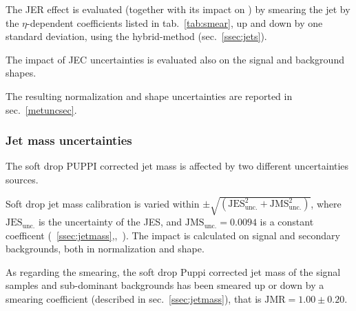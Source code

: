 \noindent The JER effect is evaluated (together with its impact on \MET) by smearing the jet \pt by the $\eta$-dependent coefficients listed in tab.~\ref{tab:smear}, up and down by one standard deviation, using the hybrid-method (sec.~\ref{ssec:jets}).%

\noindent The impact of JEC uncertainties is evaluated also on the signal and background shapes.

\noindent The resulting normalization and shape uncertainties are reported in sec.~\ref{metuncsec}.%




\subsubsection{Jet mass uncertainties}

The soft drop PUPPI corrected jet mass is affected by two different uncertainties sources.

\noindent Soft drop jet mass calibration is varied within $\pm \sqrt{ \left( \text{JES}_\text{unc.}^2 + \text{JMS}_\text{unc.}^2 \right) }$, where $\text{JES}_\text{unc.}$ is the uncertainty of the JES, and $\text{JMS}_\text{unc.}=0.0094$ is a constant coefficent (~\ref{ssec:jetmass},\cite{bib:1748-0221-6-11-P11002},~\cite{CMS-DP-2016-020}). The impact is calculated on signal and secondary backgrounds, both in normalization and shape.

\noindent As regarding the smearing, the soft drop Puppi corrected jet mass of the signal samples and sub-dominant backgrounds has been smeared up or down by a smearing coefficient (described in sec.~\ref{ssec:jetmass}), that is $ \text{JMR} = 1.00 \pm 0.20$.

